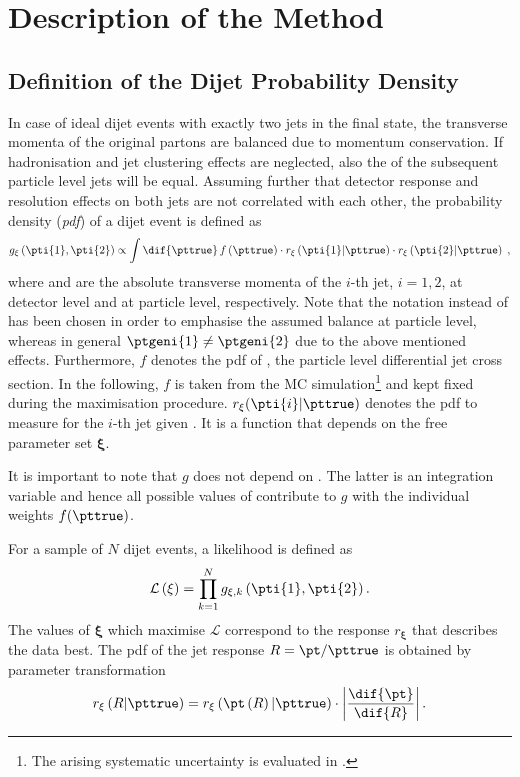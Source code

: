

\section{Description of the Method}\label{sec:ResFit:Method}

\subsection{Definition of the Dijet Probability Density}
In case of ideal dijet events with exactly two jets in the final
state, the transverse momenta of the original partons are balanced due
to momentum conservation.
If hadronisation and jet clustering effects are neglected, also the
\ptgen of the subsequent particle level jets will be equal.
Assuming further that detector response and resolution effects on both jets are not correlated with each other, the probability density (\textit{pdf}) of a dijet event is defined as
\begin{equation}
  \label{eq:ResFit:DijetPdf}
  g_{\mathbf{\xi}}\left(\pti{1},\pti{2}\right) \propto \int\dif{\pttrue}\,f\left(\pttrue\right)
  \cdot r_{\mathbf{\xi}}\left(\pti{1}|\pttrue\right)
  \cdot r_{\mathbf{\xi}}\left(\pti{2}|\pttrue\right) \; ,
\end{equation}
where  and \pttrue are the absolute transverse momenta of the
$i$-th jet, \mbox{$i = 1,2$}, at detector level and at particle level, respectively.
Note that the notation \pttrue instead of \ptgen has been chosen in order to emphasise the assumed \pt
balance at particle level, whereas in general \mbox{$\ptgeni{1} \neq \ptgeni{2}$} due to the above
mentioned effects.
Furthermore, $f$ denotes the pdf of \pttrue, \ie the particle level differential jet 
cross section.
In the following, $f$ is taken from the MC
simulation\footnote{The arising systematic uncertainty is evaluated in
  .}
and kept fixed during the maximisation procedure.
$r_{\mathbf{\xi}}(\pti{i}|\pttrue)$ denotes the pdf to measure  for the
$i$-th jet given \pttrue.
It is a function that depends on the free parameter set $\mathbf{\xi}$.

It is important to note that $g$ does not depend on \pttrue.
The latter is an integration variable and hence all possible values of \pttrue
contribute to $g$ with the individual weights $f(\pttrue)$.

For a sample of $N$ dijet events, a likelihood is defined as
\begin{equation}
  \label{eq:ResFit:Likelihood}
  \mathcal{L}\left(\mathbf{\xi}\right) = \prod^{N}_{k=1} g_{\mathbf{\xi},k}\left(\pti{1},\pti{2}\right).
\end{equation}
The values of $\mathbf{\xi}$ which maximise $\mathcal{L}$ correspond
to the response $r_{\mathbf{\xi}}$ that describes the data best.
The pdf of the jet \pt response \mbox{$R = \pt / \pttrue$} is obtained by parameter transformation
\begin{equation*}
  r_{\mathbf{\xi}}\left(R|\pttrue\right) =
  r_{\mathbf{\xi}}\left(\pt\left(R\right)|\pttrue\right)\cdot\left|\frac{\dif{\pt}}{\dif{R}}\right|.
\end{equation*}


